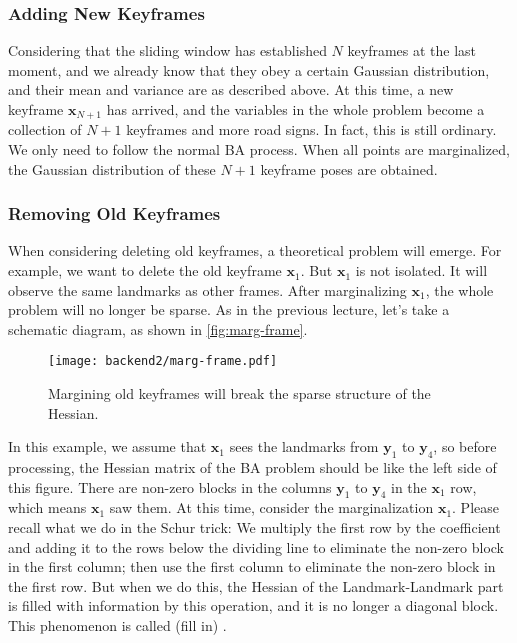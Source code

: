 \subsubsection{Adding New Keyframes}
Considering that the sliding window has established $N$ keyframes at the last moment, and we already know that they obey a certain Gaussian distribution, and their mean and variance are as described above. At this time, a new keyframe $\bm{x}_{N+1}$ has arrived, and the variables in the whole problem become a collection of $N+1$ keyframes and more road signs. In fact, this is still ordinary. We only need to follow the normal BA process. When all points are marginalized, the Gaussian distribution of these $N+1$ keyframe poses are obtained.

\subsubsection{Removing Old Keyframes}
When considering deleting old keyframes, a theoretical problem will emerge. For example, we want to delete the old keyframe $\bm{x}_1$. But $\bm{x}_1$ is not isolated. It will observe the same landmarks as other frames. After marginalizing $\bm{x}_1$, the whole problem will no longer be sparse. As in the previous lecture, let's take a schematic diagram, as shown in \autoref{fig:marg-frame}.

\begin{figure}[!ht]
	\centering
	\texttt{[image: backend2/marg-frame.pdf]}
	\caption{Margining old keyframes will break the sparse structure of the Hessian.}
	\label{fig:marg-frame}
\end{figure}

In this example, we assume that $\bm{x}_1$ sees the landmarks from $\bm{y}_1$ to $\bm{y}_4$, so before processing, the Hessian matrix of the BA problem should be like the left side of this figure. There are non-zero blocks in the columns $\bm{y}_1$ to $\bm{y}_4$ in the $\bm{x}_1$ row, which means $\bm{x}_1 $ saw them. At this time, consider the marginalization $\bm{x}_1$. Please recall what we do in the Schur trick: We multiply the first row by the coefficient and adding it to the rows below the dividing line to eliminate the non-zero block in the first column; then use the first column to eliminate the non-zero block in the first row. But when we do this, the Hessian of the Landmark-Landmark part is filled with information by this operation, and it is no longer a diagonal block. This phenomenon is called (fill in) {\cite{Sibley2008}}.

